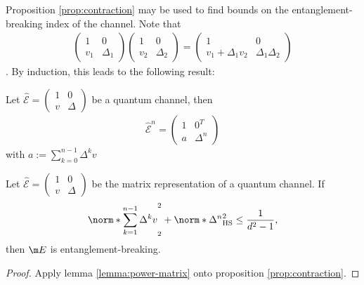 Proposition \ref{prop:contraction} may be used to find bounds on the entanglement-breaking index of the channel. Note that
\begin{align}
\begin{pmatrix}
1 & 0 \\
v_1 & \Delta_1
\end{pmatrix}
\begin{pmatrix}
1 & 0 \\
v_2 & \Delta_2
\end{pmatrix}
=
\begin{pmatrix}
1 & 0 \\
v_1 + \Delta_1 v_2 & \Delta_1 \Delta_2
\end{pmatrix}
\end{align}. 
By induction, this leads to the following result:
\begin{lemma}
    Let $\hat{\mathcal{E}} = \left(\begin{smallmatrix} 1 & 0 \\ v & \Delta \end{smallmatrix}\right)$ be a quantum channel, then 
\begin{align*}
\hat{\mathcal{E}}^n = \begin{pmatrix} 1 & 0^T \\ a & \Delta^n \end{pmatrix}
\end{align*}
with $a := \sum_{k=0}^{n-1} \Delta^k v$\label{lemma:power-matrix}
\end{lemma}
\begin{prop}
    Let $\hat{\mathcal{E}} = \left(\begin{smallmatrix} 1 & 0 \\ v & \Delta \end{smallmatrix}\right)$ be the matrix representation of a quantum channel. If 
    \begin{align*}
        \norm*{\sum_{k=1}^{n-1}\Delta^k v}_2^2 + \norm*{\Delta^n}_\text{HS}^2 \leq \frac{1}{d^2-1},
    \end{align*}
    then $\m E$ is entanglement-breaking.
\end{prop}
\begin{proof}
    Apply lemma \ref{lemma:power-matrix} onto proposition \ref{prop:contraction}.
\end{proof}



